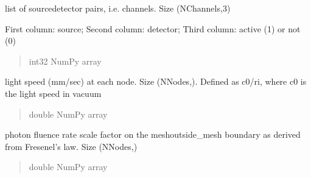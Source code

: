 \documentclass[letterpaper,10pt,english]{sphinxmanual}
\begin{document}
\begin{fulllineitems}
\begin{fulllineitems}
\begin{quote}
\begin{description}
\end{description}\end{quote}

\end{fulllineitems}


\begin{fulllineitems}
\label{\detokenize{_autosummary/nirfasterff.base.dcs_mesh.dcsmesh:nirfasterff.base.dcs_mesh.dcsmesh.link}}
\pysigstartsignatures
\pysigline
{}
\pysigstopsignatures
\sphinxAtStartPar
list of source\sphinxhyphen{}detector pairs, i.e. channels. Size (NChannels,3)

\sphinxAtStartPar
First column: source; Second column: detector; Third column: active (1) or not (0)
\begin{quote}\begin{description}
\sphinxAtStartPar
int32 NumPy array

\end{description}\end{quote}

\end{fulllineitems}


\begin{fulllineitems}
\label{\detokenize{_autosummary/nirfasterff.base.dcs_mesh.dcsmesh:nirfasterff.base.dcs_mesh.dcsmesh.c}}
\pysigstartsignatures
\pysigline
{}
\pysigstopsignatures
\sphinxAtStartPar
light speed (mm/sec) at each node.  Size (NNodes,). Defined as c0/ri, where c0 is the light speed in vacuum
\begin{quote}\begin{description}
\sphinxAtStartPar
double NumPy array

\end{description}\end{quote}

\end{fulllineitems}


\begin{fulllineitems}
\label{\detokenize{_autosummary/nirfasterff.base.dcs_mesh.dcsmesh:nirfasterff.base.dcs_mesh.dcsmesh.ksi}}
\pysigstartsignatures
\pysigline
{}
\pysigstopsignatures
\sphinxAtStartPar
photon fluence rate scale factor on the mesh\sphinxhyphen{}outside\_mesh boundary as derived from Fresenel’s law. Size (NNodes,)
\begin{quote}\begin{description}
\sphinxAtStartPar
double NumPy array


\end{description}
\end{quote}
\end{fulllineitems}
\end{fulllineitems}
\end{document}
